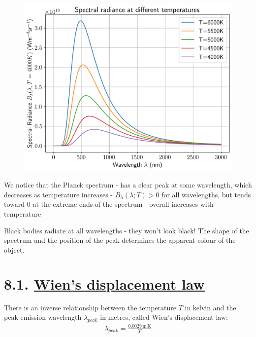 \documentclass[
  letterpaper,
  DIV=11,
  numbers=noendperiod]{scrreprt}
\begin{document}
\begin{figure}[H]

{\centering \includegraphics{SP1.1_-_Stellar_Properties_files/figure-pdf/cell-22-output-1.png}

}

\end{figure}

We notice that the Planck spectrum - has a clear peak at some
wavelength, which decreases as temperature increases -
\(B_\lambda(\lambda;T)> 0\) for all wavelengths, but tends toward \(0\)
at the extreme ends of the spectrum - overall increases with temperature

Black bodies radiate at all wavelengths - they won't look black! The
shape of the spectrum and the position of the peak determines the
apparent colour of the object.

\hypertarget{wiens-displacement-law}{%
\section{\texorpdfstring{8.1. \protect\hyperlink{toc0_}{Wien's
displacement
law}}{8.1. Wien's displacement law}}\label{wiens-displacement-law}}

There is an inverse relationship between the temperature \(T\) in kelvin
and the peak emission wavelength \(\lambda_{peak}\) in metres, called
Wien's displacement law: \begin{align}
\lambda_{peak} = \frac{0.0029\,\mathrm{m\,K}}{T}
\end{align}
\end{document}
